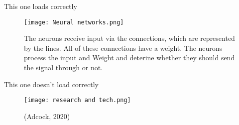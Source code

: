 
This one loads correctly

\begin{figure}[h]
    \centering
    \texttt{[image: Neural networks.png]}
    \caption{The neurons receive input via the connections, which are represented by the lines. All of these connections have a weight. The neurons process the input and Weight and deterine whether they should send the signal through or not.}
    \label{fig: Neural networks}
\end{figure}

This one doesn't load correctly

\begin{figure}[h]
    \centering
    \texttt{[image: research and tech.png]}
    \caption{(Adcock, 2020)}
    \label{fig: Rechearch and tech}
\end{figure}

